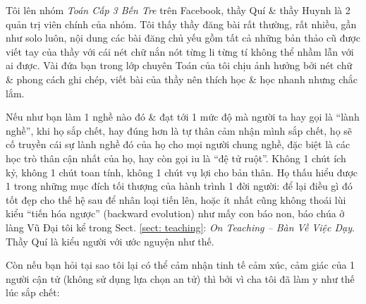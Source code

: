 \documentclass[12pt,twoside]{book}
\begin{document}
Tôi lên nhóm {\it Toán Cấp 3 Bến Tre} trên Facebook, thầy {\sc Quí} \& thầy {\sc Huynh} là 2 quản trị viên chính của nhóm. Tôi thấy thầy đăng bài rất thường, rất nhiều, gần như solo luôn, nội dung các bài đăng chủ yếu gồm tất cả những bản thảo cũ được viết tay của thầy với cái nét chữ nắn nót từng li từng tí không thể nhầm lẫn với ai được. Vài đứa bạn trong lớp chuyên Toán của tôi chịu ảnh hưởng bởi nét chữ \& phong cách ghi chép, viết bài của thầy nên thích học \& học nhanh nhưng chắc lắm.

Nếu như bạn làm 1 nghề nào đó \& đạt tới 1 mức độ mà người ta hay gọi là ``lành nghề'', khi họ sắp chết, hay đúng hơn là tự thân cảm nhận mình sắp chết, họ sẽ cố truyền cái sự lành nghề đó của họ cho mọi người chung nghề, đặc biệt là các học trò thân cận nhất của họ, hay còn gọi iu là ``đệ tử ruột''. Không 1 chút ích kỷ, không 1 chút toan tính, không 1 chút vụ lợi cho bản thân. Họ thấu hiểu được 1 trong những mục đích tối thượng của hành trình 1 đời người: để lại điều gì đó tốt đẹp cho thế hệ sau để nhân loại tiến lên, hoặc ít nhất cũng không thoái lùi kiểu ``tiến hóa ngược'' (backward evolution) như mấy con báo non, báo chúa ở làng Vũ Đại tôi kể trong Sect. \ref{sect: teaching}: {\it On Teaching -- Bàn Về Việc Dạy}. Thầy {\sc Quí} là kiểu người với ước nguyện như thế.

Còn nếu bạn hỏi tại sao tôi lại có thể cảm nhận tinh tế cảm xúc, cảm giác của 1 người cận tử (không sử dụng lựa chọn an tử) thì bởi vì cha tôi đã làm y như thế lúc sắp chết:
\end{document}
